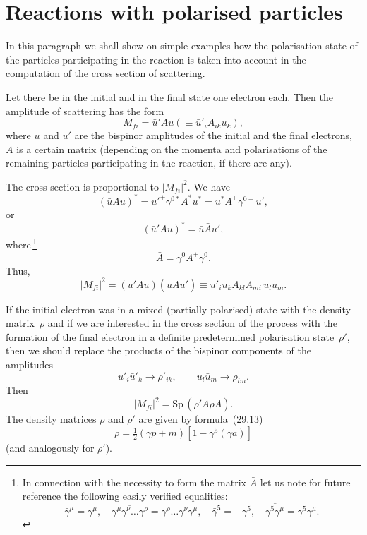 \section{Reactions with polarised particles}

In this paragraph we shall show on simple examples how the polarisation state of the particles participating in the reaction is taken into account in the computation of the cross section of scattering.

Let there be in the initial and in the final state one electron each. Then the amplitude of scattering has the form
\begin{equation}
M_{fi} = \bar{u}'Au(\equiv \bar{u}'_i A_{ik} u_k),
\tag{65.1}
\end{equation}
where $u$ and $u'$ are the bispinor amplitudes of the initial and the final electrons, $A$ is a certain matrix (depending on the momenta and polarisations of the remaining particles participating in the reaction, if there are any).

The cross section is proportional to $|M_{fi}|^2$. We have
\[
(\bar{u}Au)^* = u'^+\gamma^{0*}A^*u^* = u^*A^+\gamma^{0+}u',
\]
or
\begin{equation}
(\bar{u}'Au)^* = \bar{u}\bar{A}u',
\tag{65.2}
\end{equation}
where\,\footnote{In connection with the necessity to form the matrix $\bar{A}$ let us note for future reference the following easily verified equalities:
\begin{equation}
\bar{\gamma}^\mu = \gamma^\mu,\quad \overline{\gamma^\mu\gamma^\nu\ldots\gamma^\rho} = \gamma^\rho\ldots\gamma^\nu\gamma^\mu,\quad \bar{\gamma}^5 = -\gamma^5,\quad \overline{\gamma^5\gamma^\mu} = \gamma^5\gamma^\mu.
\tag{65.2a}
\end{equation}}
\[
\bar{A} = \gamma^0 A^+\gamma^0.
\]
Thus,
\begin{equation}
|M_{fi}|^2 = (\bar{u}'Au)(\bar{u}\bar{A}u') \equiv \bar{u}'_i\bar{u}_k A_{kl}\bar{A}_{mi}\,u_l\bar{u}_m.
\tag{65.3}
\end{equation}

If the initial electron was in a mixed (partially polarised) state with the density matrix~$\rho$ and if we are interested in the cross section of the process with the formation of the final electron in a definite predetermined polarisation state~$\rho'$, then we should replace the products of the bispinor components of the amplitudes
\[
u'_i\bar{u}'_k \to \rho'_{ik},\qquad u_l\bar{u}_m \to \rho_{lm}.
\]
Then
\begin{equation}
|M_{fi}|^2 = \mathrm{Sp}\,(\rho'A\rho\bar{A}).
\tag{65.4}
\end{equation}
The density matrices $\rho$ and $\rho'$ are given by formula~(29.13)
\begin{equation}
\rho = \tfrac{1}{2}(\gamma p + m)[1 - \gamma^5(\gamma a)]
\tag{65.5}
\end{equation}
(and analogously for $\rho'$).

